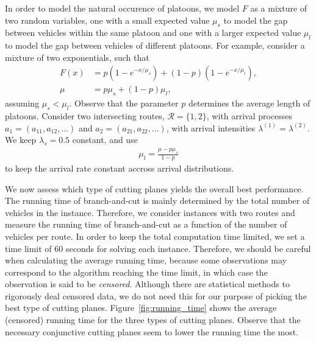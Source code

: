 \documentclass[a4paper]{article}
\theoremstyle{definition}
\theoremstyle{plain}
\begin{document}
In order to model the natural occurence of platoons, we model $F$ as a mixture
of two random variables, one with a small expected value $\mu_{s}$ to model the gap
between vehicles within the same platoon and one with a larger expected value $\mu_{l}$ to
model the gap between vehicles of different platoons. For example, consider a
mixture of two exponentials, such that
\begin{align*}
  F(x) &= p ( 1 - e^{-x / \mu_{s}} ) + (1 - p) (1 - e^{-x / \mu_{l}}) , \\[0.2em]
  \mu &= p \mu_{s} + (1-p) \mu_{l} ,
\end{align*}
%
assuming $\mu_{s} < \mu_{l}$. Observe that the parameter $p$ determines
the average length of platoons.
%
Consider two intersecting routes, $\mathcal{R} = \{1, 2\}$, with arrival processes
$a_{1} = (a_{11}, a_{12}, \dots)$ and $a_{2} = (a_{21}, a_{22}, \dots)$, with
arrival intensities $\lambda^{(1)} = \lambda^{(2)}$.
%
We keep $\lambda_{s} = 0.5$ constant, and use
\begin{align*}
  \mu_{l}  = \frac{\mu - p \mu_{s}}{1 - p}
\end{align*}
to keep the arrival rate constant accross arrival distributions.

We now assess which type of cutting planes yields the overall best performance.
The running time of branch-and-cut is mainly determined by the total number of
vehicles in the instance. Therefore, we consider instances with two routes and
measure the running time of branch-and-cut as a function of the number of
vehicles per route.
%
In order to keep the total computation time limited, we set a time limit of 60
seconds for solving each instance. Therefore, we should be careful when
calculating the average running time, because some observations may correspond
to the algorithm reaching the time limit, in which case the observation is said
to be \textit{censored}. Although there are statistical methods to rigorously
deal censored data, we do not need this for our purpose of picking the best type
of cutting planes.
%
Figure~\ref{fig:running_time} shows the average (censored) running time for the
three types of cutting planes. Observe that the necessary conjunctive cutting
planes seem to lower the running time the most.
\end{document}
